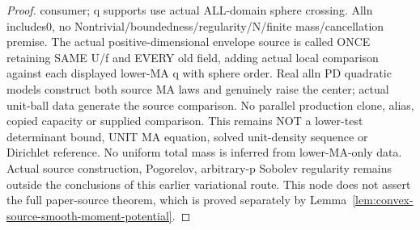 \begin{proof}
consumer; q supports use actual ALL-domain sphere crossing. Alln includes0, no Nontrivial/boundedness/regularity/N/finite mass/cancellation premise. The actual positive-dimensional envelope source is called ONCE retaining SAME U/f and EVERY old field, adding actual local comparison against each displayed lower-MA q with sphere order. Real alln PD quadratic models construct both source MA laws and genuinely raise the center; actual unit-ball data generate the source comparison. No parallel production clone, alias, copied capacity or supplied comparison. This remains NOT a lower-test determinant bound, UNIT MA equation, solved unit-density sequence or Dirichlet reference. No uniform total mass is inferred from lower-MA-only data. Actual source construction, Pogorelov,
  arbitrary-p Sobolev regularity remains outside the conclusions of this earlier variational
  route. This node does not assert the full paper-source theorem, which is proved separately by
  Lemma~\ref{lem:convex-source-smooth-moment-potential}.
\end{proof}


